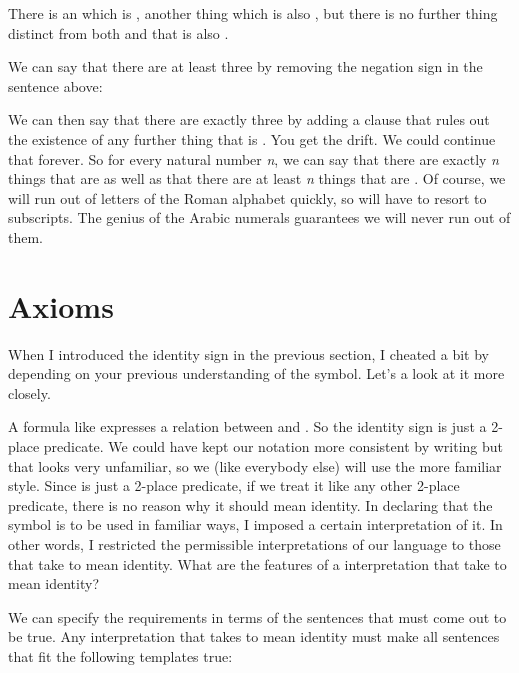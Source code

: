 There is an  which is , another thing  which is also , but 
there is no further thing distinct from both  and  that is also .

We can say that there are at least three by removing the negation sign in the 
sentence above:

\begin{argument}

\aitem {}

\end{argument}

We can then say that there are exactly three by adding a clause that rules out 
the existence of any further thing that is . You get the drift. We could 
continue that forever. So for every natural number \emph{n}, we can say that 
there are exactly \emph{n} things that are  as well as that there are at 
least \emph{n} things that are . Of course, we will run out of letters of 
the Roman alphabet quickly, so will have to resort to subscripts. The genius of 
the Arabic numerals guarantees we will never run out of them. 




\section{Axioms}\label{sec:axioms}

When I introduced the identity sign in the previous section, I cheated a bit by 
depending on your previous understanding of the \p{=} symbol. Let's a look at it 
more closely.

A formula like  expresses a relation between  and .  
So the identity sign is just a 2-place predicate. We could have kept our 
notation more consistent by writing  but 
that looks very unfamiliar, so we (like everybody else) will use the more 
familiar style.  Since \p{=} is just a 2-place predicate, if we treat it like 
any other 2-place predicate, there is no reason why it should mean identity.  In 
declaring that the symbol is to be used in familiar ways, I  imposed a certain 
interpretation of it. In other words, I restricted the permissible interpretations of our 
language to those that take \p{=} to mean identity.  What are the features of a 
interpretation that take \p{=} to mean identity?

We can specify the requirements in terms of the sentences that must come out to 
be true. Any interpretation that takes \p{=} to mean identity must make all sentences 
that fit the following templates true:
\begin{argument}

 \aitem {}

 \aitem {}

\end{argument}

